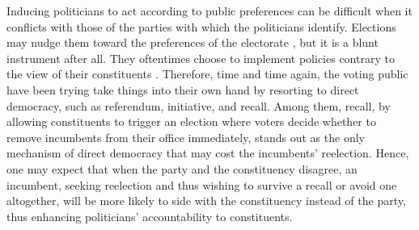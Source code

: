 \documentclass[hyphens, crop=false]{standalone}
\begin{document}
	
	Inducing politicians to act according to public preferences can be difficult when
	it conflicts with those of the parties with which the politicians identify.
	Elections may nudge them toward the preferences of the electorate
	\autocite{millerConstituencyInfluenceCongress1963},
	but it is a blunt instrument after all. 
	They oftentimes choose to implement policies contrary to the view of their constituents
	\autocite{kirklandIndecisionAmericanLegislatures2018}.
	Therefore, time and time again, the voting public have been trying take things into their own hand
	by resorting to direct democracy, such as referendum, initiative, and recall. 
	Among
	them,
	recall,
	by allowing constituents to trigger an election where voters decide whether to remove incumbents from their office immediately, 
	stands out as the only
	mechanism of direct democracy
	that may cost the incumbents' reelection.
	Hence,
	one may
	expect that 
	when the party and the constituency disagree,
	an incumbent,
	seeking reelection and thus 
	wishing to survive a recall or 
	avoid one altogether,
	will be more likely to side with the constituency instead of the party,
	thus enhancing politicians' accountability to constituents.
	
\end{document}
